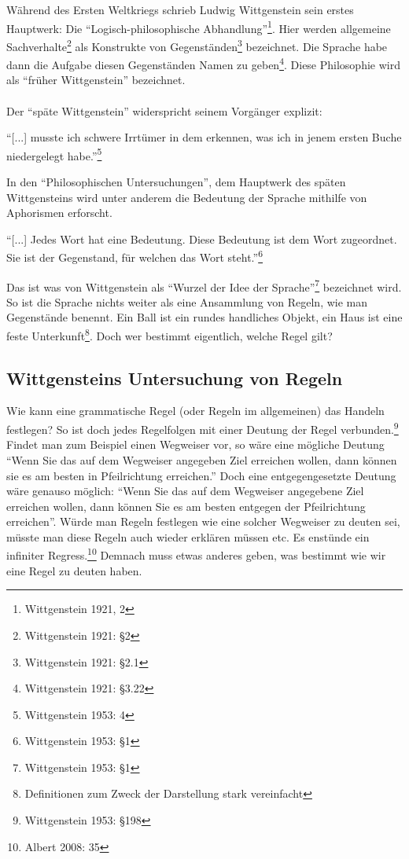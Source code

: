 \documentclass[a4paper,10pt]{article}
\begin{document}
Während des Ersten Weltkriegs schrieb Ludwig Wittgenstein sein erstes Hauptwerk: Die \enquote{Logisch-philosophische Abhandlung}\footnote{Wittgenstein 1921, 2}. Hier werden allgemeine Sachverhalte\footnote{Wittgenstein 1921: §2} als Konstrukte von Gegenständen\footnote{Wittgenstein 1921: §2.1} bezeichnet. Die Sprache habe dann die Aufgabe diesen Gegenständen Namen zu geben\footnote{Wittgenstein 1921: §3.22}. Diese Philosophie wird als \enquote{früher Wittgenstein} bezeichnet. \\
\\
Der \enquote{späte Wittgenstein} widerspricht seinem Vorgänger explizit:
\begin{displayquote}
\enquote{[...] musste ich schwere Irrtümer in dem erkennen, was ich in jenem ersten Buche niedergelegt habe.}\footnote{Wittgenstein 1953: 4}
\end{displayquote}
In den \enquote{Philosophischen Untersuchungen}, dem Hauptwerk des späten Wittgensteins wird unter anderem die Bedeutung der Sprache mithilfe von Aphorismen erforscht. 
\begin{displayquote}
\enquote{[...] Jedes Wort hat eine Bedeutung. Diese Bedeutung ist dem Wort zugeordnet. Sie ist der Gegenstand, für welchen das Wort steht.}\footnote{Wittgenstein 1953: §1}
\end{displayquote}
Das ist was von Wittgenstein als \enquote{Wurzel der Idee der Sprache}\footnote{Wittgenstein 1953: §1} bezeichnet wird. So ist die Sprache nichts weiter als eine Ansammlung von Regeln, wie man Gegenstände benennt. Ein Ball ist ein rundes handliches Objekt, ein Haus ist eine feste Unterkunft\footnote{Definitionen zum Zweck der Darstellung stark vereinfacht}. Doch wer bestimmt eigentlich, welche Regel gilt?


\subsection{Wittgensteins Untersuchung von Regeln}
Wie kann eine grammatische Regel (oder Regeln im allgemeinen) das Handeln festlegen? So ist doch jedes Regelfolgen mit einer Deutung der Regel verbunden.\footnote{Wittgenstein 1953: §198} \\
Findet man zum Beispiel einen Wegweiser vor, so wäre eine mögliche Deutung \enquote{Wenn Sie das auf dem Wegweiser angegeben Ziel erreichen wollen, dann können sie es am besten in Pfeilrichtung erreichen.} Doch eine entgegengesetzte Deutung wäre genauso möglich: \enquote{Wenn Sie das auf dem Wegweiser angegebene Ziel erreichen wollen, dann können Sie es am besten entgegen der Pfeilrichtung erreichen}. Würde man Regeln festlegen wie eine solcher Wegweiser zu deuten sei, müsste man diese Regeln auch wieder erklären müssen etc. Es enstünde ein infiniter Regress.\footnote{Albert 2008: 35} Demnach muss etwas anderes geben, was bestimmt wie wir eine Regel zu deuten haben.
\end{document}

